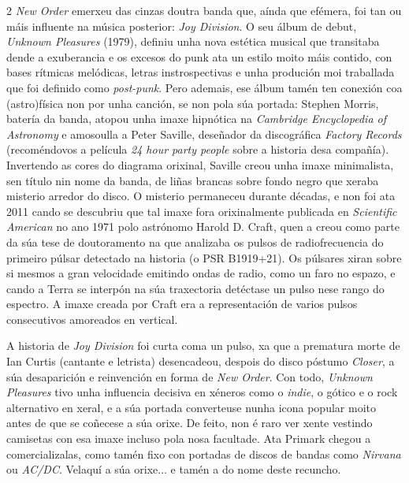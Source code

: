 \begin{multicols}{2}
\textit{New Order} emerxeu das cinzas doutra banda que, aínda que efémera, foi
tan ou máis influente na música posterior: \textit{Joy Division}. O seu álbum
de debut, \textit{Unknown Pleasures} (1979), definiu unha nova estética musical
que transitaba dende a exuberancia e os excesos do punk ata un estilo
moito máis contido, con bases rítmicas melódicas, letras instrospectivas e unha
produción moi traballada que foi definido como \textit{post-punk}. Pero
ademais, ese álbum tamén ten conexión coa (astro)física non por unha canción,
se non pola súa portada: Stephen Morris, batería da banda, atopou unha imaxe
hipnótica na \textit{Cambridge Encyclopedia of Astronomy} e amosoulla a Peter
Saville, deseñador da discográfica \textit{Factory Records} (recoméndovos a
película \textit{24 hour party people} sobre a historia desa compañía).
Invertendo as cores do diagrama orixinal, Saville creou unha imaxe minimalista,
sen título nin nome da banda, de liñas brancas sobre fondo negro que xeraba
misterio arredor do disco. O misterio permaneceu durante décadas, e non foi ata
2011 cando se descubriu que tal imaxe fora orixinalmente publicada en
\textit{Scientific American} no ano 1971 polo astrónomo Harold D. Craft, quen a
creou como parte da súa tese de doutoramento na que analizaba os pulsos de
radiofrecuencia do primeiro púlsar detectado na historia (o PSR B1919+21). Os
púlsares xiran sobre si mesmos a gran velocidade emitindo ondas de radio, como %
un faro no espazo, e cando a Terra se interpón na súa traxectoria detéctase un
pulso nese rango do espectro. A imaxe creada por Craft era a representación de
varios pulsos consecutivos amoreados en vertical.

A historia de \textit{Joy Division} foi curta coma un pulso, xa que a prematura
morte de Ian Curtis (cantante e letrista) desencadeou, despois do disco póstumo
\textit{Closer}, a súa desaparición e reinvención en forma de \textit{New
Order}. Con todo, \textit{Unknown Pleasures} tivo unha influencia decisiva en
xéneros como o \textit{indie}, o gótico e o rock alternativo en xeral, e a súa
portada converteuse nunha icona popular moito antes de que se coñecese a súa
orixe. De feito, non é raro ver xente vestindo camisetas con esa imaxe incluso
pola nosa facultade. Ata Primark chegou a comercializalas, como tamén fixo con
portadas de discos de bandas como \textit{Nirvana} ou \textit{AC/DC}. Velaquí a
súa orixe... e tamén a do nome deste recuncho.

\end{multicols}

